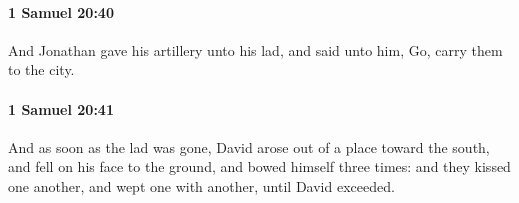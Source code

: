 		\paragraph{1 Samuel 20:40} %
			\label{1SAMUEL-20-40}

			And Jonathan gave his artillery unto his lad, and said unto him, Go, carry them to the city.


		\paragraph{1 Samuel 20:41} %
			\label{1SAMUEL-20-41}

			And as soon as the lad was gone, David arose out of a place toward the south, and fell on his face to the ground, and bowed himself three times: and they kissed one another, and wept one with another, until David exceeded.


